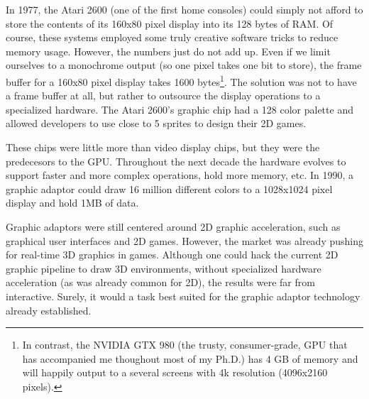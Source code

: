 \documentclass[ twoside,openright,titlepage,numbers=noenddot,%
headinclude,footinclude,cleardoublepage=empty,abstract=on,
BCOR=5mm,paper=a4,fontsize=11pt, dvipsnames
]{scrreprt}
\newcommand{\gpu}{\gls{GPU}\xspace}
\begin{document}
In 1977, the Atari 2600 (one of the first home consoles) could simply not afford to store the contents of its 160x80 pixel display into its 128 bytes of RAM. Of course, these systems employed some truly creative software tricks to reduce memory usage. However, the numbers just do not add up. Even if we limit ourselves to a monochrome output (so one pixel takes one bit to store), the frame buffer for a 160x80 pixel display takes 1600 bytes\footnote{In contrast, the NVIDIA GTX 980 (the trusty, consumer-grade, GPU that has accompanied me thoughout most of my Ph.D.) has 4 GB of memory and will happily output to a several screens with 4k resolution (4096x2160 pixels).}.
The solution was not to have a frame buffer at all, but rather to outsource the display operations to a specialized hardware. The Atari 2600's graphic chip had a 128 color palette and allowed developers to use close to 5 sprites to design their 2D games.

These chips were little more than video display chips, but they were the predecesors to the \gpu.
Throughout the next decade the hardware evolves to support faster and more complex operations, hold more memory, etc. In 1990, a graphic adaptor could draw 16 million different colors to a 1028x1024 pixel display and hold 1MB of data.

Graphic adaptors were still centered around 2D graphic acceleration, such as graphical user interfaces and 2D games. However, the market was already pushing for real-time 3D graphics in games. Although one could hack the current 2D graphic pipeline to draw 3D environments, without specialized hardware acceleration (as was already common for 2D), the results were far from interactive. Surely, it would a task best suited for the graphic adaptor technology already established.
\end{document}
